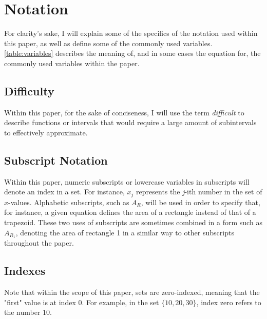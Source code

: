 \documentclass{paper}
\begin{document}
\section{Notation}
\label{sec:notation}
For clarity's sake, I will explain some of the specifics of the notation used within this paper, as well as define some of the commonly used variables.
\cref{table:variables} describes the meaning of, and in some cases the equation for, the commonly used variables within the paper.

\subsection{Difficulty}
Within this paper, for the sake of conciseness, I will use the term \emph{difficult} to describe functions or intervals that would require a large amount of subintervals to effectively approximate.

\subsection{Subscript Notation}
Within this paper, numeric subscripts or lowercase variables in subscripts will denote an index in a set.
For instance, \(x_j\) represents the \emph{j}-ith number in the set of \(x\)-values.
Alphabetic subscripts, such as \(A_R\), will be used in order to specify that, for instance, a given equation defines the area of a rectangle instead of that of a trapezoid.
These two uses of subscripts are sometimes combined in a form such as \(A_{R_1}\), denoting the area of rectangle 1 in a similar way to other subscripts throughout the paper.

\subsection{Indexes}
Note that within the scope of this paper, sets are zero-indexed, meaning that the "first" value is at index \(0\).
For example, in the set \(\{10, 20, 30\}\), index zero refers to the number \(10\).
\end{document}
